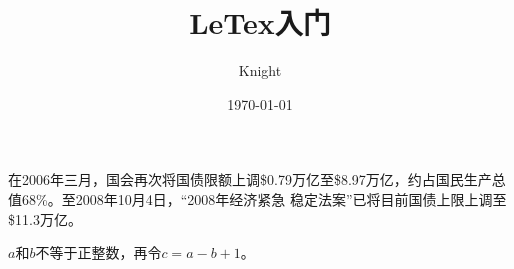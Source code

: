 \documentclass[UTF8]{ctexart}
\title{LeTex入门}
\author{Knight}
\date{\today}
\begin{document}
\maketitle
在2006年三月，国会再次将国债限额上调\$0.79万亿至\$8.97万亿，约占国民生产总值68\%。至2008年10月4日，``2008年经济紧急
稳定法案''已将目前国债上限上调至\$11.3万亿。

$a$和$b$不等于正整数，再令$c=a-b+1$。
\end{document}
